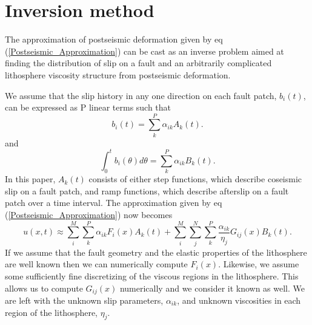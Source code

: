\documentclass[12pt]{article}
\begin{document}
\section{Inversion method}
The approximation of postseismic deformation given by eq
(\ref{Postseismic_Approximation}) can be cast as an inverse problem
aimed at finding the distribution of slip on a fault and an
arbitrarily complicated lithosphere viscosity structure from
postseismic deformation.
  
We assume that the slip history in any one direction on each
fault patch, $b_i(t)$, can be expressed as P linear terms such that
\begin{equation}
  b_i(t) = \sum_k^P \alpha_{ik}A_k(t) .
\end{equation}
and
\begin{equation}
  \int_0^t b_i(\theta)d\theta = \sum_k^P\alpha_{ik}B_k(t) .
\end{equation}
In this paper, $A_k(t)$ consists of either step functions, which
describe coseismic slip on a fault patch, and ramp functions, which
describe afterslip on a fault patch over a time interval.  The
approximation given by eq (\ref{Postseismic_Approximation}) now
becomes
\begin{equation}\label{Postseismic_Approximation2}
u(x,t) \approx \sum_i^M\sum_k^P\alpha_{ik}F_i(x)A_k(t) + 
               \sum_i^M\sum_j^N\sum_k^P\frac{\alpha_{ik}}{\eta_j}G_{ij}(x)B_k(t).
\end{equation}
If we assume that the fault geometry and the elastic properties of the
lithosphere are well known then we can numerically compute
$F_i(x)$. Likewise, we assume some sufficiently fine discretizing
of the viscous regions in the lithosphere. This allows us to compute
$G_{ij}(x)$ numerically and we consider it known as well.  We are
left with the unknown slip parameters, $\alpha_{ik}$, and unknown
viscosities in each region of the lithosphere, $\eta_j$.
\end{document}
